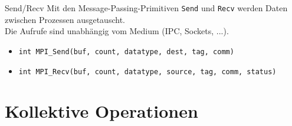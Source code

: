 \documentclass{beamer}
\begin{document}
\begin{frame}{Send/Recv}
	Mit den Message-Passing-Primitiven \texttt{Send} und \texttt{Recv} werden Daten zwischen Prozessen ausgetauscht.\\
	Die Aufrufe sind unabhängig vom Medium (IPC, Sockets, ...).

	\begin{figure}
	\end{figure}

	\begin{itemize}
		\item {\footnotesize \texttt{int MPI\_Send(buf, count, datatype, dest, tag, comm)}}
		\item {\footnotesize \texttt{int MPI\_Recv(buf, count, datatype, source, tag, comm, status)}}
	\end{itemize}
\end{frame}

\section{Kollektive Operationen}
\end{document}
